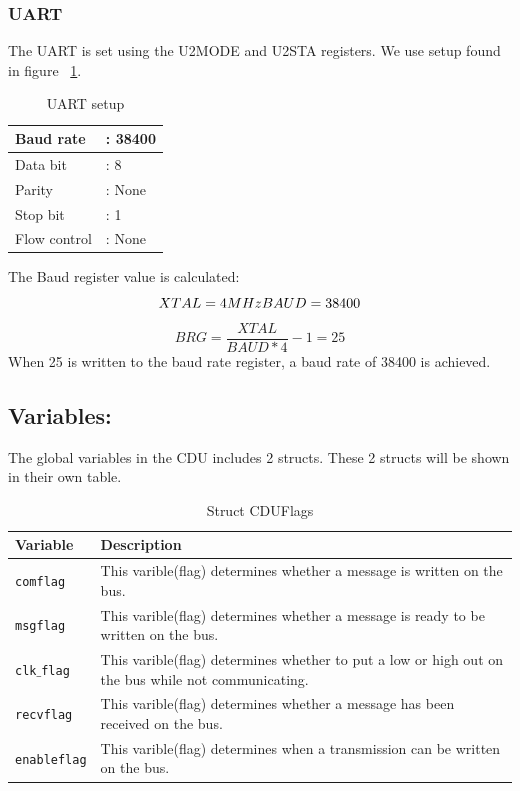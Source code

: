 \subsubsection{UART}
The UART is set using the U2MODE and U2STA registers. We use setup found in figure ~\ref{fig:uartsetp}.\\
\begin{table}[H]
	\centering
    \begin{tabular}{|l l|}
    \hline
    Baud rate    & : 38400 \\ \hline
    Data bit     & : 8    \\ \hline
    Parity       & : None \\ \hline
    Stop bit     & : 1    \\ \hline
    Flow control & : None \\ \hline
    \end{tabular}
    \label{fig:uartsetp}
    \caption{UART setup}
\end{table}
The Baud register value is calculated:\\
\begin{equation}
XTAL = 4 MHz $\\$ 
BAUD = 38400 
\end{equation}
\begin{equation}
BRG = \frac{XTAL}{BAUD*4} - 1 = 25
\end{equation}
When 25 is written to the baud rate register, a baud rate of 38400 is achieved.

\subsection{Variables:}
The global variables in the CDU includes 2 structs. These 2 structs will be shown in their own table.
\begin{table}[H]
\begin{tabular}{|l|p{10cm}|}
\hline
\cellcolor[gray]{0.8}\textbf{Variable} &\cellcolor[gray]{0.8} \textbf{Description}\\ \hline
\texttt{comflag} & This varible(flag) determines whether a message is written on the bus.\\ 
\hline
\texttt{msgflag} & This varible(flag) determines whether a message is ready to be written on the bus.\\ 
\hline
\texttt{clk$\_$flag} & This varible(flag) determines whether to put a low or high out on the bus while not communicating.\\ 
\hline
\texttt{recvflag} & This varible(flag) determines whether a message has been received on the bus.\\ 
\hline
\texttt{enableflag} & This varible(flag) determines when a transmission can be written on the bus.\\ 
\hline
\end{tabular}
\label{tab:structcduflags}
\caption{Struct CDUFlags}
\end{table}

